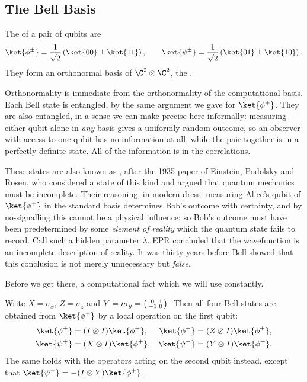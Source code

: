\subsection{The Bell Basis}\label{sec:bellbasis}

\begin{definition}
	The  of a pair of qubits are
	$$\ket{\phi^\pm} = \frac{1}{\sqrt2}\left(\ket{00}\pm\ket{11}\right), \qquad \ket{\psi^\pm} = \frac{1}{\sqrt2}\left(\ket{01}\pm\ket{10}\right).$$
	They form an orthonormal basis of $\C^2\otimes\C^2$, the .
\end{definition}

Orthonormality is immediate from the orthonormality of the computational basis. Each Bell state is entangled, by the same argument we gave for $\ket{\phi^+}$. They are also  entangled, in a sense we can make precise here informally: measuring either qubit alone in \emph{any} basis gives a uniformly random outcome, so an observer with access to one qubit has no information at all, while the pair together is in a perfectly definite state. All of the information is in the correlations.

These states are also known as , after the 1935 paper of Einstein, Podolsky and Rosen, who considered a state of this kind and argued that quantum mechanics must be incomplete. Their reasoning, in modern dress: measuring Alice's qubit of $\ket{\phi^+}$ in the standard basis determines Bob's outcome with certainty, and by no-signalling this cannot be a physical influence; so Bob's outcome must have been predetermined by some \emph{element of reality} which the quantum state fails to record. Call such a hidden parameter $\lambda$. EPR concluded that the wavefunction is an incomplete description of reality. It was thirty years before Bell showed that this conclusion is not merely unnecessary but \emph{false}.

Before we get there, a computational fact which we will use constantly.

\begin{proposition}
	Write $X = \sigma_x$, $Z = \sigma_z$ and $Y = i\sigma_y = \begin{psmallmatrix} 0 & 1 \\ -1 & 0\end{psmallmatrix}$. Then all four Bell states are obtained from $\ket{\phi^+}$ by a local operation on the first qubit:
	\begin{align*}
		\ket{\phi^+} &= (I\otimes I)\ket{\phi^+}, & \ket{\phi^-} &= (Z\otimes I)\ket{\phi^+},\\
		\ket{\psi^+} &= (X\otimes I)\ket{\phi^+}, & \ket{\psi^-} &= (Y\otimes I)\ket{\phi^+}.
	\end{align*}
	The same holds with the operators acting on the second qubit instead, except that $\ket{\psi^-} = -(I\otimes Y)\ket{\phi^+}$.
\end{proposition}

